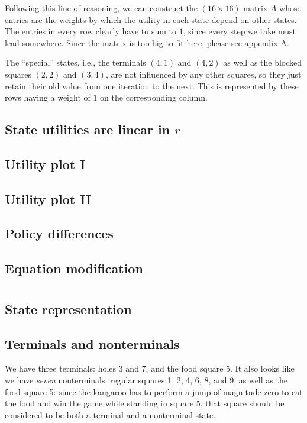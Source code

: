 \documentclass[letterpaper, 10pt]{article}
\begin{document}
\begin{multicols}{2}
Following this line of reasoning, we can construct the $(16 \times 16)$ matrix $A$ whose entries are the weights by which the utility in each state depend on other states. The entries in every row clearly have to sum to $1$, since every step we take must lead somewhere. Since the matrix is too big to fit here, please see appendix A.

The ``special'' states, i.e., the terminals $(4, 1)$ and $(4, 2)$ as well as the blocked squares $(2,2)$ and $(3, 4)$, are not influenced by any other squares, so they just retain their old value from one iteration to the next. This is represented by these rows having a weight of $1$ on the corresponding column.


\subsection{State utilities are linear in $r$}

\subsection{Utility plot I}

\subsection{Utility plot II}

\subsection{Policy differences}

\subsection{Equation modification}


\section{}
\subsection{State representation}

\subsection{Terminals and nonterminals}
We have three terminals: holes 3 and 7, and the food square 5. It also looks like we have \emph{seven} nonterminals: regular squares 1, 2, 4, 6, 8, and 9, as well as the food square 5: since the kangaroo has to perform a jump of magnitude zero to eat the food and win the game while standing in square 5, that square should be considered to be both a terminal and a nonterminal state. 


\end{multicols}
\end{document}
